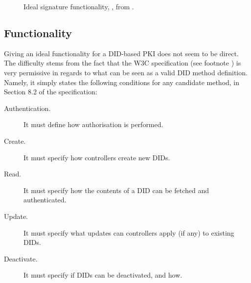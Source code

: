 \begin{figure}
\begin{framed}
\begin{minipage}[t]{0.5\textwidth}
{      }
    \end{minipage}
    \begin{minipage}[t]{0.5\textwidth}
    \end{minipage}
  \end{framed}
  \caption{Ideal signature functionality, \IdealFSig, from \cite{canetti03}.}
  \label{fig:faobb}
\end{figure}

\subsection{Functionality \IdealFPKIDID}


Giving an ideal functionality for a DID-based PKI does not seem to be direct.
The difficulty stems from the fact that the W3C specification (see footnote
) is very permissive in regards to what can be seen as a valid DID
method definition. Namely, it simply states the following conditions for any
candidate method, in Section 8.2 of the specification:

\begin{description}
\item[Authentication.] It must define how authorisation is performed.  
\item[Create.] It must specify how controllers create new DIDs.
\item[Read.] It must specify how the contents of a DID can be fetched and
  authenticated.
\item[Update.] It must specify what updates can controllers apply (if any)
  to existing DIDs.
\item[Deactivate.] It must specify if DIDs can be deactivated, and how.
\end{description}

